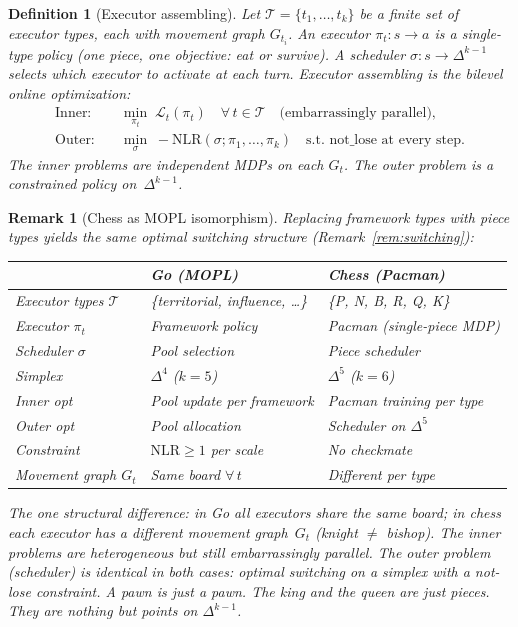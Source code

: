 \documentclass[11pt,a4paper]{article}
\newtheorem{definition}[theorem]{Definition}
\newtheorem{remark}[theorem]{Remark}
\newcommand{\cL}{\mathcal{L}}
\newcommand{\cT}{\mathcal{T}}
\begin{document}
\begin{definition}[Executor assembling]\label{def:executor-assembling}
Let $\cT = \{t_1, \ldots, t_k\}$ be a finite set of \emph{executor types},
each with movement graph $G_{t_i}$.
An \emph{executor} $\pi_{t}: s \to a$ is a single-type policy
(one piece, one objective: eat or survive).
A \emph{scheduler} $\sigma: s \to \Delta^{k-1}$ selects which
executor to activate at each turn.
\emph{Executor assembling} is the bilevel online optimization:
\begin{align}
  \text{Inner:} \quad & \min_{\pi_t} \; \cL_t(\pi_t)
    \quad \forall\, t \in \cT
    \quad \text{(embarrassingly parallel)}, \label{eq:inner} \\
  \text{Outer:} \quad & \min_\sigma \; -\mathrm{NLR}(\sigma; \pi_1, \ldots, \pi_k)
    \quad \text{s.t.\ not\_lose at every step}. \label{eq:outer}
\end{align}
The inner problems are independent MDPs on each $G_t$.
The outer problem is a constrained policy on~$\Delta^{k-1}$.
\end{definition}

\begin{remark}[Chess as MOPL isomorphism]\label{rem:chess-iso}
Replacing framework types with piece types yields the
same optimal switching structure (Remark~\ref{rem:switching}):

\medskip
\begin{center}
\begin{tabular}{@{}lll@{}}
\toprule
& \textbf{Go (MOPL)} & \textbf{Chess (Pacman)} \\
\midrule
Executor types $\cT$ & \{territorial, influence, \ldots\} & \{P, N, B, R, Q, K\} \\
Executor $\pi_t$ & Framework policy & Pacman (single-piece MDP) \\
Scheduler $\sigma$ & Pool selection & Piece scheduler \\
Simplex & $\Delta^4$ ($k = 5$) & $\Delta^5$ ($k = 6$) \\
Inner opt & Pool update per framework & Pacman training per type \\
Outer opt & Pool allocation & Scheduler on $\Delta^5$ \\
Constraint & $\mathrm{NLR} \geq 1$ per scale & No checkmate \\
Movement graph $G_t$ & Same board $\forall\, t$ & Different per type \\
\bottomrule
\end{tabular}
\end{center}

\medskip
\noindent
The one structural difference: in Go all executors share the same
board; in chess each executor has a different movement
graph~$G_t$ (knight $\neq$ bishop).
The inner problems are heterogeneous but still embarrassingly
parallel.
The outer problem (scheduler) is identical in both cases:
optimal switching on a simplex with a not-lose constraint.
A pawn is just a pawn.
The king and the queen are just pieces.
They are nothing but points on $\Delta^{k-1}$.
\end{remark}
\end{document}
